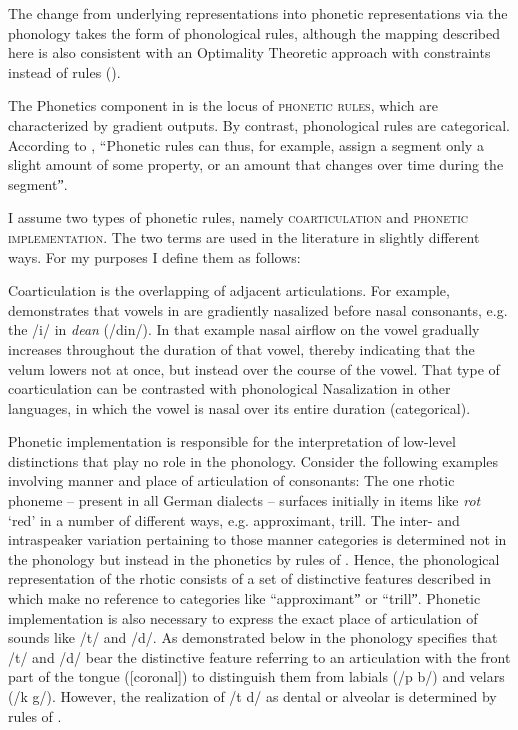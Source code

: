 The change from underlying representations into phonetic representations via the phonology takes the form of phonological rules, although the mapping described here is also consistent with an Optimality Theoretic approach with constraints instead of rules (\citealt{PrinceSmolensky2004}).

The Phonetics component in  is the locus of \textsc{phonetic rules}, which are characterized by gradient outputs. By contrast, phonological rules are categorical. According to \citet[452]{Keating1990}, “Phonetic rules can thus, for example, assign a segment only a slight amount of some property, or an amount that changes over time during the segmentˮ.

I assume two types of phonetic rules, namely \textsc{coarticulation} and \textsc{phonetic} \textsc{implementation}. The two terms are used in the literature in slightly different ways. For my purposes I define them as follows:

Coarticulation is the overlapping of adjacent articulations. For example, \citet{Cohn1993} demonstrates that vowels in  are gradiently nasalized before nasal consonants, e.g. the /i/ in \textit{dean} (/din/). In that example nasal airflow on the vowel gradually increases throughout the duration of that vowel, thereby indicating that the velum lowers not at once, but instead over the course of the vowel. That type of  coarticulation can be contrasted with phonological Nasalization in other languages, in which the vowel is nasal over its entire duration (categorical).

Phonetic implementation is responsible for the interpretation of low-level distinctions that play no role in the phonology. Consider the following examples involving manner and place of articulation of consonants: The one rhotic phoneme -- present in all German dialects -- surfaces initially in items like \textit{rot} ‘red’ in a number of different ways, e.g. approximant, trill. The inter- and intraspeaker variation pertaining to those manner categories is determined not in the phonology but instead in the phonetics by rules of . Hence, the phonological representation of the rhotic consists of a set of distinctive features described in  which make no reference to categories like “approximantˮ or “trillˮ. Phonetic implementation is also necessary to express the exact place of articulation of sounds like /t/ and /d/. As demonstrated below in  the phonology specifies that /t/ and /d/ bear the distinctive feature referring to an articulation with the front part of the tongue ([coronal]) to distinguish them from labials (/p b/) and velars (/k g/). However, the realization of /t d/ as dental or alveolar is determined by rules of .

